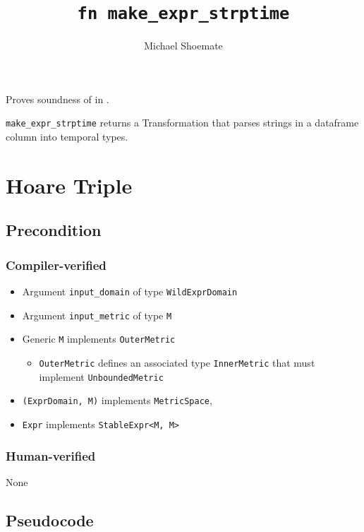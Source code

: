 \documentclass{article}
\title{\texttt{fn make\_expr\_strptime}}
\author{Michael Shoemate}
\date{}
\begin{document}
\maketitle

\contrib
Proves soundness of  in .

\texttt{make\_expr\_strptime} returns a Transformation that parses strings in a dataframe column into temporal types.

\section{Hoare Triple}
\subsection*{Precondition}
\subsubsection*{Compiler-verified}
\begin{itemize}
    \item Argument \texttt{input\_domain} of type \texttt{WildExprDomain}
    \item Argument \texttt{input\_metric} of type \texttt{M}
    \item Generic \texttt{M} implements \texttt{OuterMetric}
    \begin{itemize}
        \item \texttt{OuterMetric} defines an associated type \texttt{InnerMetric} that must implement \texttt{UnboundedMetric}
    \end{itemize}
    \item \texttt{(ExprDomain, M)} implements \texttt{MetricSpace},
    \item \texttt{Expr} implements \texttt{StableExpr<M, M>}
\end{itemize}

\subsubsection*{Human-verified}
None

\subsection*{Pseudocode}

\end{document}
